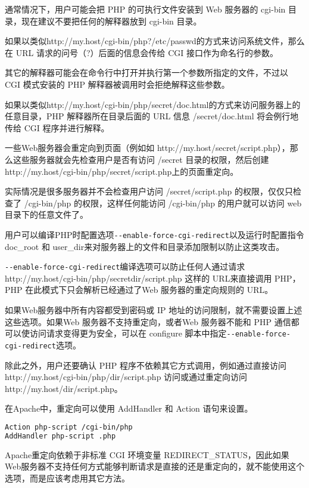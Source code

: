 通常情况下，用户可能会把 PHP 的可执行文件安装到 Web 服务器的 cgi-bin 目录，现在建议不要把任何的解释器放到 cgi-bin 目录。

如果以类似http://my.host/cgi-bin/php?/etc/passwd的方式来访问系统文件，那么在 URL 请求的问号（?）后面的信息会传给 CGI 接口作为命名行的参数。

其它的解释器可能会在命令行中打开并执行第一个参数所指定的文件，不过以 CGI 模式安装的 PHP 解释器被调用时会拒绝解释这些参数。

如果以类似http://my.host/cgi-bin/php/secret/doc.html的方式来访问服务器上的任意目录，PHP 解释器所在目录后面的 URL 信息 /secret/doc.html 将会例行地传给 CGI 程序并进行解释。

一些Web服务器会重定向到页面（例如如 http://my.host/secret/script.php），那么这些服务器就会先检查用户是否有访问 /secret 目录的权限，然后创建 http://my.host/cgi-bin/php/secret/script.php上的页面重定向。

实际情况是很多服务器并不会检查用户访问 /secret/script.php 的权限，仅仅只检查了 /cgi-bin/php 的权限，这样任何能访问 /cgi-bin/php 的用户就可以访问 web 目录下的任意文件了。

用户可以编译PHP时配置选项\texttt{-\/-enable-force-cgi-redirect}以及运行时配置指令 doc\_root 和 user\_dir来对服务器上的文件和目录添加限制以防止这类攻击。

\texttt{-\/-enable-force-cgi-redirect}编译选项可以防止任何人通过请求http://my.host/cgi-bin/php/secretdir/script.php 这样的 URL来直接调用 PHP，PHP 在此模式下只会解析已经通过了Web 服务器的重定向规则的 URL。



如果Web服务器中所有内容都受到密码或 IP 地址的访问限制，就不需要设置上述这些选项。如果Web 服务器不支持重定向，或者Web 服务器不能和 PHP 通信都可以使访问请求变得更为安全，可以在 configure 脚本中指定\texttt{-\/-enable-force-cgi-redirect}选项。

除此之外，用户还要确认 PHP 程序不依赖其它方式调用，例如通过直接访问http://my.host/cgi-bin/php/dir/script.php 访问或通过重定向访问 http://my.host/dir/script.php。

在Apache中，重定向可以使用 AddHandler 和 Action 语句来设置。

\begin{lstlisting}[language=bash]
Action php-script /cgi-bin/php
AddHandler php-script .php
\end{lstlisting}


Apache重定向依赖于非标准 CGI 环境变量 REDIRECT\_STATUS，因此如果Web服务器不支持任何方式能够判断请求是直接的还是重定向的，就不能使用这个选项，而是应该考虑用其它方法。

